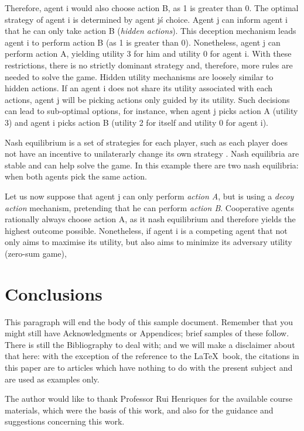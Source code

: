 Therefore, agent i would also choose action B, as 1 is greater than 0. The optimal strategy of agent i is determined by agent j\'s choice. Agent j can inform agent i that he can only take action B (\textit{hidden actions}). This deception mechanism leads agent i to perform action B (as 1 is greater than 0). Nonetheless, agent j can perform action A, yielding utility 3 for him and utility 0 for agent i. 
 With these restrictions, there is no strictly dominant strategy and, therefore, more rules are needed to solve the game. Hidden utility mechanisms are loosely similar to hidden actions. If an agent i does not share its utility associated with each actions, agent j will be picking actions only guided by its utility. Such decisions can lead to sub-optimal options, for instance, when agent j picks action A (utility 3) and agent i picks action B (utility 2 for itself and utility 0 for agent i). 
 
 
 Nash equilibrium is a set of strategies for each player, such as each player does not have an incentive to unilaterarly change its own strategy \cite{rh}. Nash equilibria are stable and can help solve the game. In this example there are two nash equilibria: when both agents pick the same action.
 
Let us now suppose that agent j can only perform \textit{action A}, but is using a \textit{decoy action} mechanism, pretending that he can perform \textit{action B}. Cooperative agents rationally always choose action A, as it nash equilibrium and therefore yields the highest outcome possible. Nonetheless, if agent i is a competing agent that not only aims to maximise its utility, but also aims to minimize its adversary utility (zero-sum game), 

\section{Conclusions}
This paragraph will end the body of this sample document.
Remember that you might still have Acknowledgments or
Appendices; brief samples of these
follow.  There is still the Bibliography to deal with; and
we will make a disclaimer about that here: with the exception
of the reference to the \LaTeX\ book, the citations in
this paper are to articles which have nothing to
do with the present subject and are used as
examples only.




\begin{acks}
  The author would like to thank Professor Rui Henriques for the available course materials, which were the basis of this work, and also for the guidance and suggestions concerning this work. 

\end{acks}

